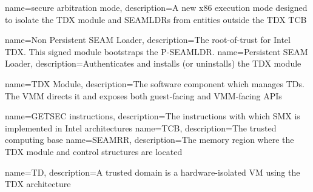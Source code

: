 {
    name=secure arbitration mode,
    description={A new x86 execution mode designed to isolate the TDX module and SEAMLDRs from entities outside the TDX TCB}
}

{
    name=Non Persistent SEAM Loader,
    description={The root-of-trust for Intel TDX. This signed module bootstraps the P-SEAMLDR.}
}
{
    name=Persistent SEAM Loader,
    description={Authenticates and installs (or uninstalls) the TDX module}
}

{
    name=TDX Module,
    description={The software component which manages TDs. The VMM directs it and exposes both guest-facing and VMM-facing APIs}
}

{
    name=GETSEC instructions,
    description={The instructions with which SMX is implemented in Intel architectures}
}
{
    name=TCB,
    description={The trusted computing base}
}
{
    name=SEAMRR,
    description={The memory region where the TDX module and control structures are located}
}

{
    name=TD,
    description={A trusted domain is a hardware-isolated VM using the TDX architecture}
}


